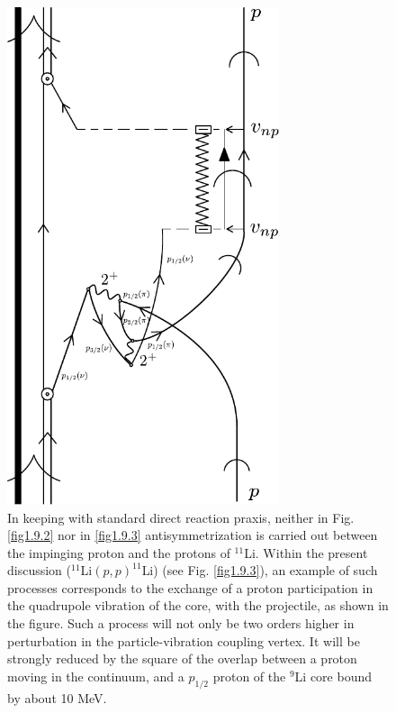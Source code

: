                \begin{figure}
               \centerline {
               \includegraphics*[width=8cm]{introduccion/figs/fig1_9_4}
               }
               \caption{In keeping with standard direct reaction praxis, neither in Fig. \ref{fig1.9.2} nor in
               \ref{fig1.9.3} antisymmetrization is carried out between the impinging proton and the protons
               of $^{11}$Li. Within the present discussion
               ($^{11}$Li$(p,p)^{11}$Li) (see Fig.  \ref{fig1.9.3}), an example of such processes corresponds to the exchange
               of a proton participation in the quadrupole vibration of the core, with the projectile, as
               shown in the figure. Such a process will not only be two orders higher in perturbation
               in the particle-vibration coupling vertex. It will be strongly reduced by the square of
               the overlap between a proton moving in the continuum, and a $p_{1/2}$ proton of the $^{9}$Li
               core bound by about 10 MeV.}
               \label{fig1.9.4}
               \end{figure}
          
